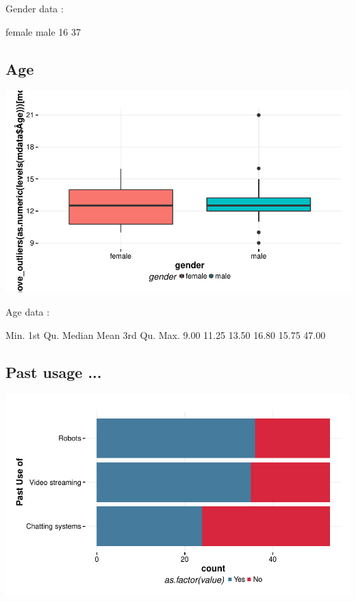 \documentclass{article}
\begin{document}
Gender data : 
\begin{Schunk}
\begin{Soutput}
female   male 
    16     37 
\end{Soutput}
\end{Schunk}

\subsection{Age}
\includegraphics{Raw_num/plots/-plot_gender_age}

Age data : 
\begin{Schunk}
\begin{Soutput}
   Min. 1st Qu.  Median    Mean 3rd Qu.    Max. 
   9.00   11.25   13.50   16.80   15.75   47.00 
\end{Soutput}
\end{Schunk}

\subsection{Past usage ...}

\includegraphics{Raw_num/plots/-plot_past_use}
\end{document}
